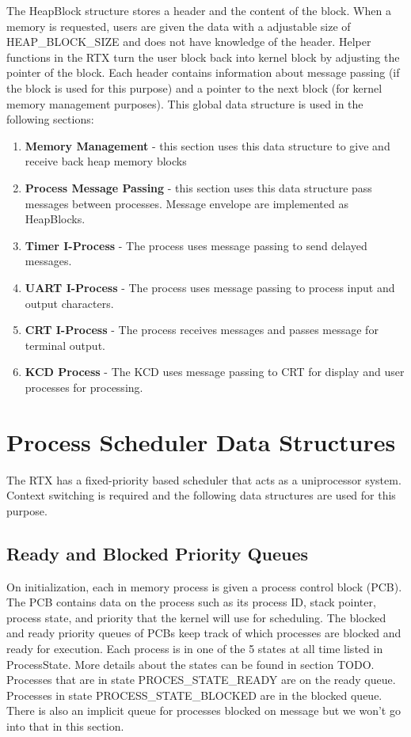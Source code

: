 \documentclass[12pt]{report}
\begin{document}
The HeapBlock structure stores a header and the content of the block. When a memory is requested, users are given the data with a adjustable size of HEAP\_BLOCK\_SIZE and does not have knowledge of the header. Helper functions in the RTX turn the user block back into kernel block by adjusting the pointer of the block. Each header contains information about message passing (if the block is used for this purpose) and a pointer to the next block (for kernel memory management purposes). This global data structure is used in the following sections:
\begin{enumerate}
    \item {\bf Memory Management} - this section uses this data structure to give and receive back heap memory blocks
    \item {\bf Process Message Passing} - this section uses this data structure pass messages between processes. Message envelope are implemented as HeapBlocks.
    \item {\bf Timer I-Process} - The process uses message passing to send delayed messages.
    \item {\bf UART I-Process} - The process uses message passing to process input and output characters.
    \item {\bf CRT I-Process} - The process receives messages and passes message for terminal output.
    \item {\bf KCD Process} - The KCD uses message passing to CRT for display and user processes for processing.
\end{enumerate}


\section{Process Scheduler Data Structures}
The RTX has a fixed-priority based scheduler that acts as a uniprocessor system. Context switching is required and the following data structures are used for this purpose.

\subsection{Ready and Blocked Priority Queues}
On initialization, each in memory process is given a process control block (PCB). The PCB contains data on the process such as its process ID, stack pointer, process state, and priority that the kernel will use for scheduling. The blocked and ready priority queues of PCBs keep track of which processes are blocked and ready for execution. Each process is in one of the 5 states at all time listed in ProcessState. More details about the states can be found in section TODO. Processes that are in state PROCES\_STATE\_READY are on the ready queue. Processes in state PROCESS\_STATE\_BLOCKED are in the blocked queue. There is also an implicit queue for processes blocked on message but we won't go into that in this section.
\end{document}
